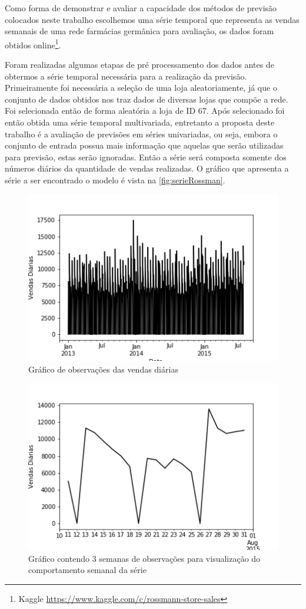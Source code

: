 \documentclass[
	12pt,
	oneside,
	a4paper,
	english,
	brazil
]{abntex2}
\begin{document}
Como forma de demonstrar e avaliar a capacidade dos métodos de previsão 
colocados neste trabalho escolhemos uma série temporal que representa as vendas 
semanais de uma rede farmácias germânica para avaliação, os dados foram obtidos 
online\footnote{Kaggle \url{https://www.kaggle.com/c/rossmann-store-sales}}.

Foram realizadas algumas etapas de pré processamento dos dados antes de obtermos 
a série temporal necessária para a realização da previsão. Primeiramente foi 
necessária a seleção de uma loja aleatoriamente, já que o conjunto de dados 
obtidos nos traz dados de diversas lojas que compõe a rede. Foi selecionada 
então de forma aleatória a loja de ID 67. Após selecionado foi então obtida uma 
série temporal multivariada, entretanto a proposta deste trabalho é a avaliação 
de previsões em séries univariadas, ou seja, embora o conjunto de entrada possua 
mais informação que aquelas que serão utilizadas para previsão, estas serão 
ignoradas. Então a série será composta somente dos números diários da quantidade 
de vendas realizadas. O gráfico que apresenta a série a ser encontrado o modelo 
é vista na \autoref{fig:serieRossman}.

\begin{figure}[ht]
    \centering
    \caption{Gráfico de observações das vendas diárias}\label{fig:serieRossman}
    \includegraphics[width=.6\textwidth]{images/graficoRossman.png}
\end{figure}

\begin{figure}[ht]
    \centering
    \caption{Gráfico contendo 3 semanas de observações para visualização do 
    comportamento semanal da série}\label{fig:serieRossmanSemana}
    \includegraphics[width=.6\textwidth]{images/graficoRossmanSemana.png}
\end{figure}
\end{document}
